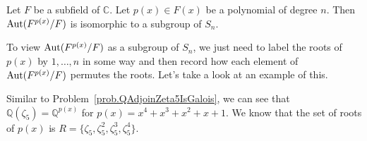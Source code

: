\begin{corollary}\label{cor.GaloisGroupIsPermGroup}
Let $F$ be a subfield of $\mathbb{C}$. Let $p(x)\in F(x)$ be a polynomial of degree $n$. Then $\operatorname{Aut}(F^{p(x)}/F)$ is isomorphic to a subgroup of $S_n$.
\end{corollary}

To view $\operatorname{Aut}(F^{p(x)}/F)$ as a subgroup of $S_n$, we just need to label the roots of $p(x)$ by $1,\ldots,n$ in some way and then record how each element of $\operatorname{Aut}(F^{p(x)}/F)$ permutes the roots. Let's take a look at an example of this.

\begin{example}\label{exam.QAdjoinZeta5GaloisAsPerms}
Similar to Problem~\ref{prob.QAdjoinZeta5IsGalois}, we can see that $\mathbb{Q}(\zeta_5) = \mathbb{Q}^{p(x)}$ for $p(x) = x^4+x^3+x^2+x+1$. We know that the set of roots of $p(x)$ is $R=\{\zeta_5,\zeta_5^2,\zeta_5^3,\zeta_5^4\}$. 


\end{example}
